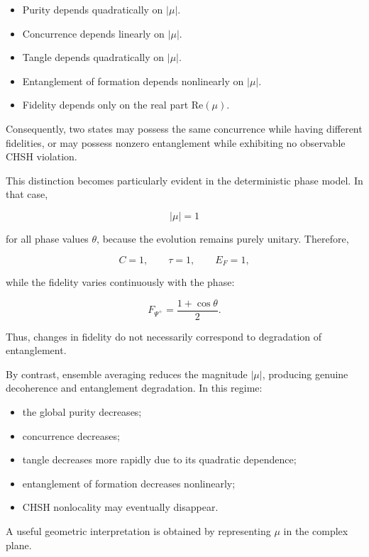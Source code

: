 \begin{itemize}
    \item Purity depends quadratically on \( |\mu| \).
    \item Concurrence depends linearly on \( |\mu| \).
    \item Tangle depends quadratically on \( |\mu| \).
    \item Entanglement of formation depends nonlinearly on \( |\mu| \).
    \item Fidelity depends only on the real part \( \mathrm{Re}(\mu) \).
\end{itemize}

\medskip

Consequently, two states may possess the same concurrence while having different fidelities, or may possess nonzero entanglement while exhibiting no observable CHSH violation.

\medskip

This distinction becomes particularly evident in the deterministic phase model. In that case,

\[
|\mu|
=
1
\]

for all phase values \( \theta \), because the evolution remains purely unitary. Therefore,

\[
C
=
1,
\qquad
\tau
=
1,
\qquad
E_F
=
1,
\]

while the fidelity varies continuously with the phase:

\[
F_{\Psi^+}
=
\frac{1+\cos\theta}{2}.
\]

Thus, changes in fidelity do not necessarily correspond to degradation of entanglement.

\medskip

By contrast, ensemble averaging reduces the magnitude \( |\mu| \), producing genuine decoherence and entanglement degradation. In this regime:

\begin{itemize}
    \item the global purity decreases;
    \item concurrence decreases;
    \item tangle decreases more rapidly due to its quadratic dependence;
    \item entanglement of formation decreases nonlinearly;
    \item CHSH nonlocality may eventually disappear.
\end{itemize}

\medskip

A useful geometric interpretation is obtained by representing \( \mu \) in the complex plane.

